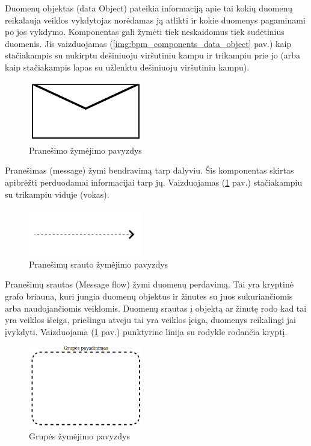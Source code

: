\documentclass{VUMIFInfBakalaurinis}
\begin{document}
Duomenų objektas (data Object) pateikia informaciją apie tai kokių duomenų reikalauja veiklos vykdytojas norėdamas ją atlikti ir kokie duomenys pagaminami po jos vykdymo. Komponentas gali žymėti tiek neskaidomus tiek sudėtinius duomenis. Jis vaizduojamas (\ref{img:bpm_components_data_object} pav.) kaip stačiakampis su nukirptu dešiniuoju viršutiniu kampu ir trikampiu prie jo (arba kaip stačiakampis lapas su užlenktu dešiniuoju viršutiniu kampu). 

\begin{figure}[H]
	\centering
	\includegraphics[width=5cm]{img/bpm-components/message}
	\caption{Pranešimo žymėjimo pavyzdys}
	\label{img:bpm_components_message}
\end{figure}

Pranešimas (message) žymi bendravimą tarp dalyviu. Šis komponentas skirtas apibrėžti perduodamai informacijai tarp jų. Vaizduojamas (\ref{img:bpm_components_message} pav.) stačiakampiu su trikampiu viduje (vokas).

\begin{figure}[H]
	\centering
	\includegraphics[width=5cm]{img/bpm-components/message_flow}
	\caption{Pranešimų srauto žymėjimo pavyzdys}
	\label{img:bpm_components_message_flow}
\end{figure}

Pranešimų srautas (Message flow) žymi duomenų perdavimą. Tai yra kryptinė grafo briauna, kuri jungia duomenų objektus ir žinutes su juos sukuriančiomis arba naudojančiomis veiklomis. Duomenų srautas į objektą ar žinutę rodo kad tai yra veiklos išeiga, priešingu atveju tai yra veiklos įeiga, duomenys reikalingi jai įvykdyti. Vaizduojama (\ref{img:bpm_components_message} pav.) punktyrine linija su rodykle rodančia kryptį.

\begin{figure}[H]
	\centering
	\includegraphics[width=5cm]{img/bpm-components/group}
	\caption{Grupės žymėjimo pavyzdys}
	\label{img:bpm_components_group}
\end{figure}
\end{document}
